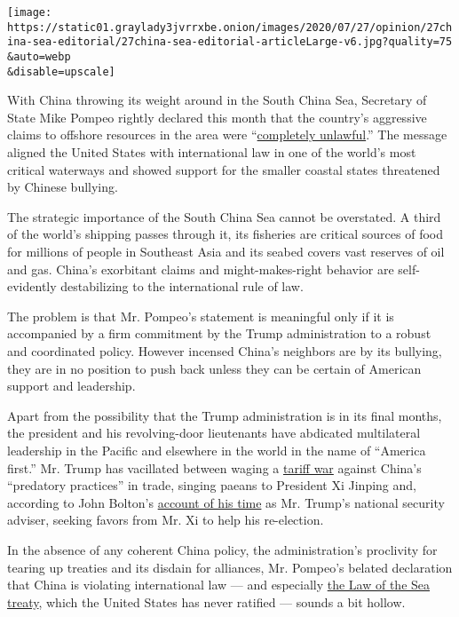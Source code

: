 \texttt{[image: https://static01.graylady3jvrrxbe.onion/images/2020/07/27/opinion/27china-sea-editorial/27china-sea-editorial-articleLarge-v6.jpg?quality=75\\\&auto=webp\\\&disable=upscale]}

With China throwing its weight around in the South China Sea, Secretary
of State Mike Pompeo rightly declared this month that the country's
aggressive claims to offshore resources in the area were
``\href{https://www.theguardian.com/world/2020/jul/14/south-china-sea-us-says-beijings-claims-to-disputed-area-completely-unlawful}{completely
unlawful}.'' The message aligned the United States with international
law in one of the world's most critical waterways and showed support for
the smaller coastal states threatened by Chinese bullying.

The strategic importance of the South China Sea cannot be overstated. A
third of the world's shipping passes through it, its fisheries are
critical sources of food for millions of people in Southeast Asia and
its seabed covers vast reserves of oil and gas. China's exorbitant
claims and might-makes-right behavior are self-evidently destabilizing
to the international rule of law.

The problem is that Mr. Pompeo's statement is meaningful only if it is
accompanied by a firm commitment by the Trump administration to a robust
and coordinated policy. However incensed China's neighbors are by its
bullying, they are in no position to push back unless they can be
certain of American support and leadership.

Apart from the possibility that the Trump administration is in its final
months, the president and his revolving-door lieutenants have abdicated
multilateral leadership in the Pacific and elsewhere in the world in the
name of ``America first.'' Mr. Trump has vacillated between waging a
\href{https://www.nytimes3xbfgragh.onion/2019/08/06/opinion/china-currency.html}{tariff
war} against China's ``predatory practices'' in trade, singing paeans to
President Xi Jinping and, according to John Bolton's
\href{https://www.washingtonpost.com/politics/trump-asked-chinas-xi-to-help-him-win-reelection-according-to-bolton-book/2020/06/17/d4ea601c-ad7a-11ea-868b-93d63cd833b2_story.html}{account
of his time} as Mr. Trump's national security adviser, seeking favors
from Mr. Xi to help his re-election.

In the absence of any coherent China policy, the administration's
proclivity for tearing up treaties and its disdain for alliances, Mr.
Pompeo's belated declaration that China is violating international law
--- and especially
\href{https://www.britannica.com/topic/Law-of-the-Sea}{the Law of the
Sea treaty}, which the United States has never ratified --- sounds a bit
hollow.


